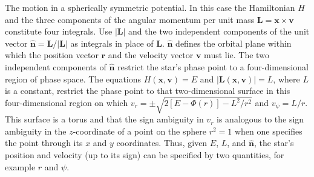 \documentclass[12pt,a4paper]{article}
\renewcommand{\vec}[1]{\boldsymbol{#1}}
\begin{document}
The motion in a spherically symmetric potential. In this case the Hamiltonian $H$ and the three components of the angular momentum per unit mass $\vec{L} = \vec{x} \times \vec{v}$ constitute four integrals. Use $|\vec{L}|$ and the two independent components of the unit vector $\hat{\vec{n}} = \vec{L}/|\vec{L}|$ as integrals in place of $\vec{L}$.  $\hat{\vec{n}}$ defines the orbital plane within which the position vector $\vec{r}$ and the velocity vector $\vec{v}$ must lie. The two independent components of $\hat{\vec{n}}$ restrict the star’s phase point to a four-dimensional region of phase space. The equations $H(\vec{x}, \vec{v}) = E$ and $|\vec{L}(\vec{x}, \vec{v})| = L$, where $L$ is a constant, restrict the phase point to that two-dimensional surface in this four-dimensional region on which $v_r = \pm \sqrt{2[E -\Phi(r)] -L^2/r^2}$ and $v_\psi = L/r$. This surface is a torus and that the sign ambiguity in $v_r$ is analogous to the sign ambiguity in the $z$-coordinate of a point on the sphere $r^2 = 1$ when one specifies the point through its $x$ and $y$ coordinates. Thus, given $E$, $L$, and $\hat{\vec{n}}$, the star's position and velocity (up to its sign) can be specified by two quantities, for example $r$ and $\psi$.
\end{document}
